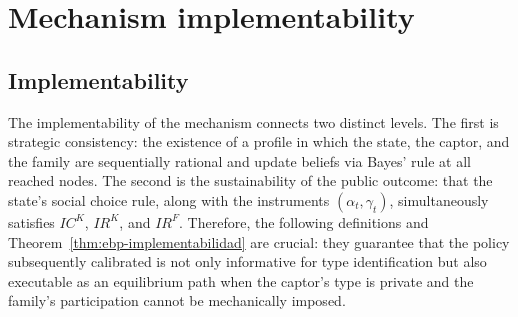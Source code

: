 \documentclass[review,authoryear,12pt]{elsarticle}
\theoremstyle{plain}
\theoremstyle{definition}
\newcommand{\1}{\mathbf{1}}
\begin{document}
\section{Mechanism implementability}\label{sec:implementabilidad}

\subsection{Implementability}\label{subsec:implementabilidad}

\noindent The implementability of the mechanism connects two distinct levels. The first is strategic consistency: the existence of a profile in which the state, the captor, and the family are sequentially rational and update beliefs via Bayes' rule at all reached nodes. The second is the sustainability of the public outcome: that the state's social choice rule, along with the instruments $(\alpha_t,\gamma_t)$, simultaneously satisfies $IC^K$, $IR^K$, and $IR^F$. Therefore, the following definitions and Theorem~\ref{thm:ebp-implementabilidad} are crucial: they guarantee that the policy subsequently calibrated is not only informative for type identification but also executable as an equilibrium path when the captor's type is private and the family's participation cannot be mechanically imposed.
\end{document}
